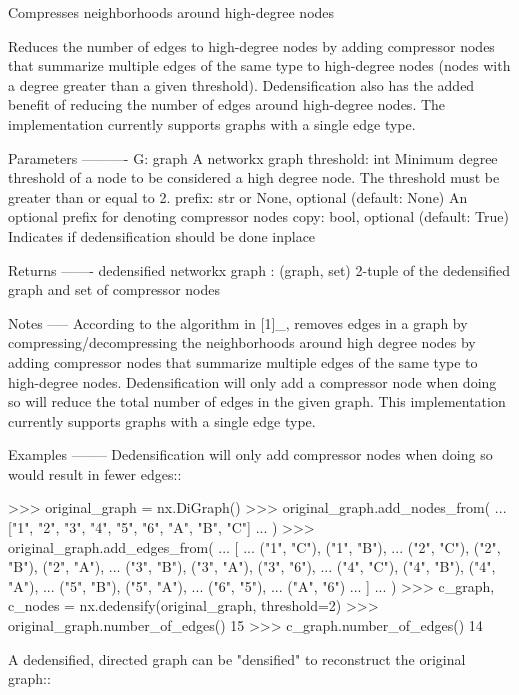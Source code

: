 \begin{DoxyVerb}Compresses neighborhoods around high-degree nodes

Reduces the number of edges to high-degree nodes by adding compressor nodes
that summarize multiple edges of the same type to high-degree nodes (nodes
with a degree greater than a given threshold).  Dedensification also has
the added benefit of reducing the number of edges around high-degree nodes.
The implementation currently supports graphs with a single edge type.

Parameters
----------
G: graph
   A networkx graph
threshold: int
   Minimum degree threshold of a node to be considered a high degree node.
   The threshold must be greater than or equal to 2.
prefix: str or None, optional (default: None)
   An optional prefix for denoting compressor nodes
copy: bool, optional (default: True)
   Indicates if dedensification should be done inplace

Returns
-------
dedensified networkx graph : (graph, set)
    2-tuple of the dedensified graph and set of compressor nodes

Notes
-----
According to the algorithm in [1]_, removes edges in a graph by
compressing/decompressing the neighborhoods around high degree nodes by
adding compressor nodes that summarize multiple edges of the same type
to high-degree nodes.  Dedensification will only add a compressor node when
doing so will reduce the total number of edges in the given graph. This
implementation currently supports graphs with a single edge type.

Examples
--------
Dedensification will only add compressor nodes when doing so would result
in fewer edges::

    >>> original_graph = nx.DiGraph()
    >>> original_graph.add_nodes_from(
    ...     ["1", "2", "3", "4", "5", "6", "A", "B", "C"]
    ... )
    >>> original_graph.add_edges_from(
    ...     [
    ...         ("1", "C"), ("1", "B"),
    ...         ("2", "C"), ("2", "B"), ("2", "A"),
    ...         ("3", "B"), ("3", "A"), ("3", "6"),
    ...         ("4", "C"), ("4", "B"), ("4", "A"),
    ...         ("5", "B"), ("5", "A"),
    ...         ("6", "5"),
    ...         ("A", "6")
    ...     ]
    ... )
    >>> c_graph, c_nodes = nx.dedensify(original_graph, threshold=2)
    >>> original_graph.number_of_edges()
    15
    >>> c_graph.number_of_edges()
    14

A dedensified, directed graph can be "densified" to reconstruct the
original graph::


\end{DoxyVerb}
